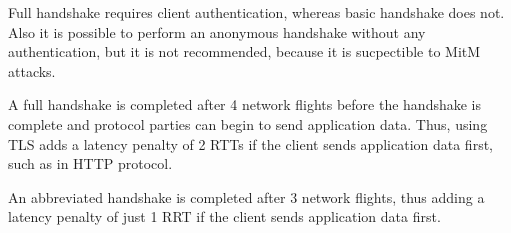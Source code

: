 Full handshake requires client authentication, whereas basic handshake does not. Also it is possible to perform an anonymous handshake without any authentication, but it is not recommended, because it is sucpectible to MitM attacks.

A full handshake is completed after 4 network flights before the handshake is complete and protocol parties can begin to send application data. Thus, using TLS adds a latency penalty of 2 RTTs if the client sends application data first, such as in HTTP protocol.

An abbreviated handshake is completed after 3 network flights, thus adding a latency penalty of just 1 RRT if the client sends application data first.

\begin{figure}
  \centering
\end{figure}
